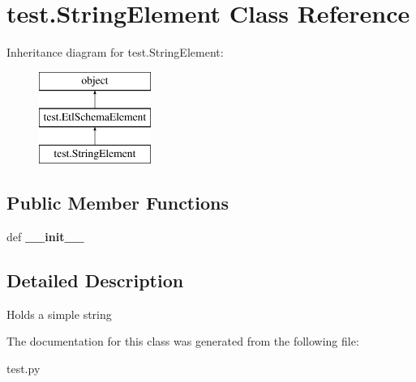 \hypertarget{classtest_1_1StringElement}{\section{test.\-String\-Element Class Reference}
\label{classtest_1_1StringElement}
}
Inheritance diagram for test.\-String\-Element\-:\begin{figure}[H]
\begin{center}
\leavevmode
\includegraphics[height=3.000000cm]{classtest_1_1StringElement}
\end{center}
\end{figure}
\subsection*{Public Member Functions}
\begin{DoxyCompactItemize}
\item 
\hypertarget{classtest_1_1StringElement_a9678f79b59a5cbce7a6ebb22c8b25796}{def {\bfseries \-\_\-\-\_\-init\-\_\-\-\_\-}}\label{classtest_1_1StringElement_a9678f79b59a5cbce7a6ebb22c8b25796}

\end{DoxyCompactItemize}


\subsection{Detailed Description}
\begin{DoxyVerb}Holds a simple string\end{DoxyVerb}
 

The documentation for this class was generated from the following file\-:\begin{DoxyCompactItemize}
\item 
test.\-py\end{DoxyCompactItemize}
